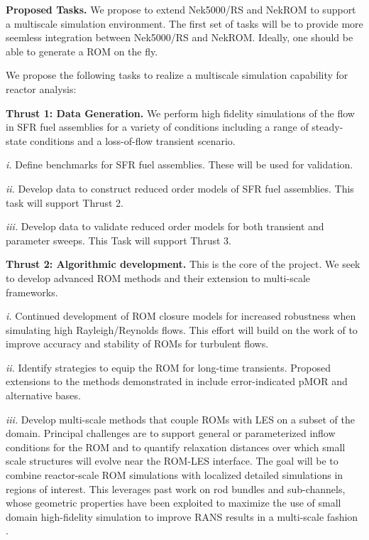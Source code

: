 \noindent
{\bf Proposed Tasks.}
We propose to extend Nek5000/RS and NekROM to support a multiscale simulation
environment.   The first set of tasks will be to provide more seemless
integration between Nek5000/RS and NekROM.  Ideally, one should be able to
generate a ROM on the fly.

We propose the following tasks to realize a multiscale simulation
capability for reactor analysis:

\textbf{Thrust 1: Data Generation.} We perform high fidelity simulations of the
flow in SFR fuel assemblies for a variety of conditions including a range of
steady-state conditions and a loss-of-flow transient scenario.
\\[-4ex]
\begin{description}
\item{\em i.}
Define benchmarks for SFR fuel assemblies. These will be used for validation.
\\[-4ex]
\item{\em ii.}
Develop data to construct reduced order models of SFR fuel assemblies. This
task will support Thrust 2.  
\\[-4ex]
\item{\em iii.} Develop data to validate reduced order models for both
transient and parameter sweeps. This Task will support Thrust 3.
\end{description}

\textbf{Thrust 2: Algorithmic development.} This is the core of the project.
We seek to develop advanced ROM methods and their extension to multi-scale
frameworks.
\\[-4ex]
\begin{description}
\item{\em i.}
Continued development of ROM closure models for increased robustness when
simulating high Rayleigh/Reynolds flows.  This effort will build on the work of
\cite{kaneko22a,kaneko22,tsai22a} to improve accuracy and stability of
ROMs for turbulent flows.
\\[-3ex]
\item{\em ii.}
Identify strategies to equip the ROM for long-time transients.  
Proposed extensions to the methods demonstrated in \cite{kaneko20a}
include error-indicated pMOR and alternative bases.
\\[-3ex]
\item{\em iii.}
Develop multi-scale methods that couple ROMs with LES on a subset of the
domain.  Principal challenges are to support general or parameterized inflow
conditions for the ROM and to quantify relaxation distances over which small
scale structures will evolve near the ROM-LES interface. The goal will be to
combine reactor-scale ROM simulations with localized detailed simulations in
regions of interest. This leverages past work on rod bundles and sub-channels,
whose geometric properties have been exploited to maximize the use of small
domain high-fidelity simulation to improve RANS results in a multi-scale
fashion \cite{martinez2019a}.  
\end{description}%

